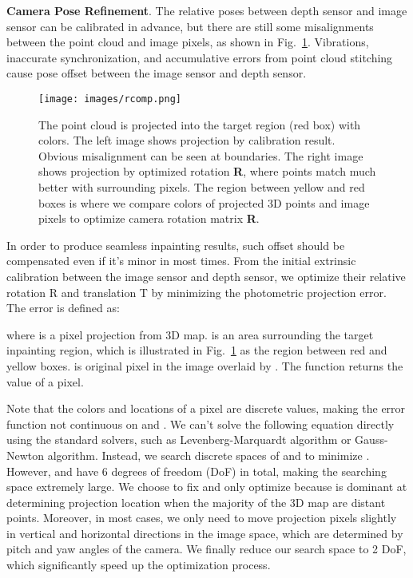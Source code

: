 \documentclass[runningheads]{llncs}
\begin{document}
\textbf{Camera Pose Refinement}. The relative poses between depth sensor and image sensor can be calibrated in advance, but there are still some misalignments between the point cloud and image pixels, as shown in Fig.~\ref{fig:misalignment}. Vibrations, inaccurate synchronization, and accumulative errors from point cloud stitching cause pose offset between the image sensor and depth sensor.

\begin{figure}[t!]
\centering
\texttt{[image: images/rcomp.png]}
   \caption{The point cloud is projected into the target region (red box) with colors. The left image shows projection by calibration result. Obvious misalignment can be seen at boundaries. The right image shows projection by optimized rotation \textbf{R}, where points match much better with surrounding pixels. The region between yellow and red boxes is where we compare colors of projected 3D points and image pixels to optimize camera rotation matrix \textbf{R}.
}
\label{fig:misalignment}
\end{figure}

In order to produce seamless inpainting results, such offset should be compensated even if it's minor in most times. From the initial extrinsic calibration between the image sensor and depth sensor, we optimize their relative rotation R and translation T by minimizing the photometric projection error. The error is defined as:
 
where  is a pixel projection from 3D map.  is an area surrounding the target inpainting region, which is illustrated in Fig.~\ref{fig:misalignment} as the region between red and yellow boxes.  is original pixel in the image overlaid by . The function  returns the value of a pixel. 

Note that the colors and locations of a pixel are discrete values, making the error function  not continuous on  and . We can't solve the following equation directly using the standard solvers, such as Levenberg-Marquardt algorithm or Gauss-Newton algorithm. Instead, we search discrete spaces of  and  to minimize . However,  and  have 6 degrees of freedom (DoF) in total, making the searching space extremely large. We choose to fix  and only optimize  because  is dominant at determining projection location when the majority of the 3D map are distant points. Moreover, in most cases, we only need to move projection pixels slightly in vertical and horizontal directions in the image space, which are determined by pitch and yaw angles of the camera. We finally reduce our search space to 2 DoF, which significantly speed up the optimization process.
\end{document}
